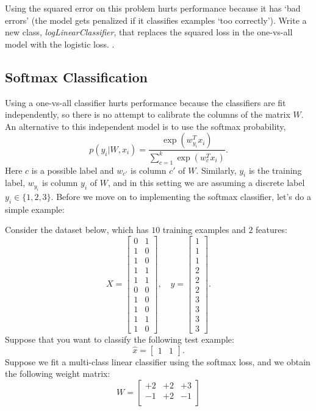 \documentclass{article}
\begin{document}
Using the squared error on this problem hurts performance because it has `bad errors' (the model gets penalized if it classifies examples `too correctly').
Write a new class, \emph{logLinearClassifier}, that replaces the squared loss in the one-vs-all model with the logistic loss. .


\subsection{Softmax Classification}

Using a one-vs-all classifier hurts performance because the classifiers are fit independently, so there is no attempt to calibrate the columns of the matrix $W$. An alternative to this independent model is to use the softmax probability,
\[
p(y_i | W, x_i) = \frac{\exp(w_{y_i}^Tx_i)}{\sum_{c=1}^k\exp(w_c^Tx_i)}.
\]
Here $c$ is a possible label and $w_{c'}$ is column $c'$ of $W$. Similarly, $y_i$ is the training label, $w_{y_i}$ is column $y_i$ of $W$, and in this setting we are assuming a discrete label $y_i \in \{1,2,3\}$. Before we move on to implementing the softmax classifier, let's do a simple example:

Consider the dataset below, which has $10$ training examples and $2$ features:
\[
X = \begin{bmatrix}0 & 1\\1 & 0\\ 1 & 0\\ 1 & 1\\ 1 & 1\\ 0 & 0\\  1 & 0\\  1 & 0\\  1 & 1\\  1 &0\end{bmatrix}, \quad y = \begin{bmatrix}1\\1\\1\\2\\2\\2\\3\\3\\3\\3\end{bmatrix}.
\]
Suppose that you want to classify the following test example:
\[
\hat{x} = \begin{bmatrix}1 & 1\end{bmatrix}.
\]
Suppose we fit a multi-class linear classifier using the softmax loss, and we obtain the following weight matrix:
\[
W =
\begin{bmatrix}
+2 & +2 & +3\\
-1 & +2 & -1\\
\end{bmatrix}
\]
\end{document}
